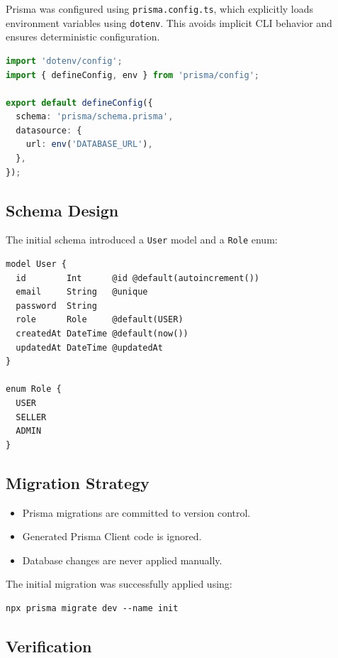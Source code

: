 \documentclass[11pt,a4paper]{article}
\begin{document}
    Prisma was configured using \texttt{prisma.config.ts}, which explicitly loads
    environment variables using \texttt{dotenv}. This avoids implicit CLI behavior
    and ensures deterministic configuration.

    \begin{lstlisting}[language=TypeScript]
import 'dotenv/config';
import { defineConfig, env } from 'prisma/config';

export default defineConfig({
  schema: 'prisma/schema.prisma',
  datasource: {
    url: env('DATABASE_URL'),
  },
});
    \end{lstlisting}

    \subsection{Schema Design}

    The initial schema introduced a \texttt{User} model and a \texttt{Role} enum:

    \begin{lstlisting}[language=Prisma]
model User {
  id        Int      @id @default(autoincrement())
  email     String   @unique
  password  String
  role      Role     @default(USER)
  createdAt DateTime @default(now())
  updatedAt DateTime @updatedAt
}

enum Role {
  USER
  SELLER
  ADMIN
}
    \end{lstlisting}

    \subsection{Migration Strategy}

    \begin{itemize}
        \item Prisma migrations are committed to version control.
        \item Generated Prisma Client code is ignored.
        \item Database changes are never applied manually.
    \end{itemize}

    The initial migration was successfully applied using:
    \begin{lstlisting}
npx prisma migrate dev --name init
    \end{lstlisting}

    \subsection{Verification}
\end{document}

